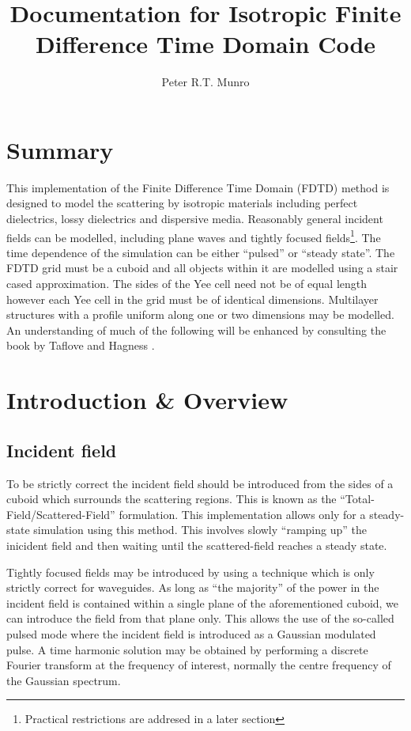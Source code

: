 \documentclass[a4paper, 12pt]{article}
\author{Peter R.T. Munro}
\title{Documentation for Isotropic Finite Difference Time Domain Code}
\begin{document}
	   
	\maketitle\tableofcontents
	\section{Summary}
	This implementation of the Finite Difference Time Domain (FDTD) method is designed to model the scattering by isotropic materials
	including perfect dielectrics, lossy dielectrics and dispersive
	media. Reasonably general incident fields can be modelled, including
	plane waves and tightly focused fields\footnote{Practical restrictions
		are addresed in a later section}. The time dependence of the
	simulation can be either ``pulsed'' or ``steady state''. The FDTD grid must be a cuboid
	and all objects within it are modelled using a stair cased
	approximation. The sides of the Yee cell need not be of equal length
	however each Yee cell in the grid must be of identical
	dimensions. Multilayer structures with a profile uniform along one or
	two dimensions may be modelled. An understanding of much of the
	following will be enhanced by consulting the book by Taflove and
	Hagness \cite{taflove00book}.
	
	\section{Introduction \& Overview}
	\subsection{Incident field}
	To be strictly correct the incident field should be introduced from
	the sides of a cuboid which surrounds the scattering regions. This is
	known as the ``Total-Field/Scattered-Field'' formulation. This
	implementation allows only for a steady-state simulation using this
	method. This involves slowly ``ramping up'' the inicident field and
	then waiting until the scattered-field reaches a steady state. 
	
	Tightly focused fields may be introduced by using a technique which is
	only strictly correct for waveguides. As long as ``the majority'' of
	the power in the incident field is contained within a single plane of
	the aforementioned cuboid, we can introduce the field from that plane
	only. This allows the use of the so-called pulsed mode where the
	incident field is introduced as a Gaussian modulated pulse. A time
	harmonic solution may be obtained by performing a discrete Fourier
	transform at the frequency of interest, normally the centre frequency
	of the Gaussian spectrum. 
	
\end{document}
